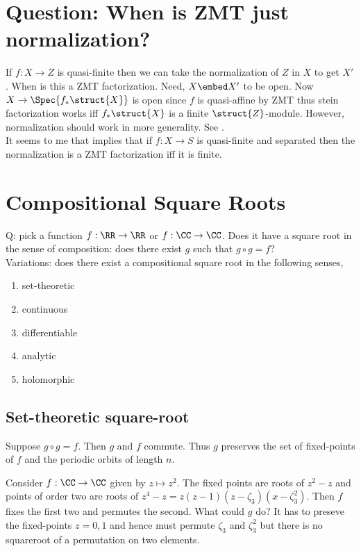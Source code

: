 \documentclass[12pt]{article}
\begin{document}
\section{Question: When is ZMT just normalization?}

If $f : X \to Z$ is quasi-finite then we can take the normalization of $Z$ in $X$ to get $X'$. When is this a ZMT factorization. Need, $X \embed X'$ to be open. Now $X \to \Spec{f_* \struct{X}}$ is open since $f$ is quasi-affine by ZMT thus stein factorization works iff $f_* \struct{X}$ is a finite $\struct{Z}$-module. However, normalization should work in more generality. See . 
\bigskip\\
It seems to me that  implies that if $f : X \to S$ is quasi-finite and separated then the normalization is a ZMT factorization iff it is finite. 

\section{Compositional Square Roots}

Q: pick a function $f : \RR \to \RR$ or $f : \CC \to \CC$. Does it have a square root in the sense of composition: does there exist $g$ such that $g \circ g = f$?
\bigskip\\
Variations: does there exist a compositional square root in the following senses,
\begin{enumerate}
\item set-theoretic
\item continuous
\item differentiable
\item analytic 
\item holomorphic
\end{enumerate}

\subsection{Set-theoretic square-root}

\begin{rmk}
Suppose $g \circ g = f$. Then $g$ and $f$ commute. Thus $g$ preserves the set of fixed-points of $f$ and the periodic orbits of length $n$. 
\end{rmk}

\begin{example}
Consider $f : \CC \to \CC$ given by $z \mapsto z^2$. The fixed points are roots of $z^2 - z$ and points of order two are roots of $z^4 - z = z (z - 1)(z - \zeta_3)(x - \zeta_3^2)$. Then $f$ fixes the first two and permutes the second. What could $g$ do? It has to preseve the fixed-points $z = 0,1$ and hence must permute $\zeta_3$ and $\zeta_3^2$ but there is no squareroot of a permutation on two elements. 
\end{example}
\end{document}
